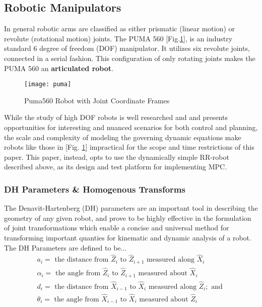 \documentclass[journal]{IEEEtran}
\begin{document}
\subsection{Robotic Manipulators}

In general robotic arms are classified as either prismatic (linear motion) or revolute (rotational motion) joints. The PUMA 560 [Fig.\ref{puma560}], is an industry standard 6 degree of freedom (DOF) manipulator. It utilizes six revolute joints, connected in a serial fashion. This configuration of only rotating joints makes the PUMA 560 an \textbf{articulated robot}.

\begin{figure}
    \centering
    \texttt{[image: puma]}
    \caption{Puma560 Robot with Joint Coordinate Frames}
    \label{puma560}
\end{figure}

While the study of high DOF robots is well researched and and presents opportunities for interesting and nuanced scenarios for both control and planning, the scale and complexity of modeling the governing dynamic equations make robots like those in [Fig. \ref{puma560}] impractical for the scope and time restrictions of this paper. \cite{armstrong_explicit_1986} This paper, instead, opts to use the dynamically simple RR-robot described above, as its design and test platform for implementing MPC.\\



\subsubsection{DH Parameters \& Homogenous Transforms}

The Denavit-Hartenberg (DH) parameters are an important tool in describing the geometry of any given robot, and prove to be highly effective in the formulation of joint transformations which enable a concise and universal method for transforming important quanties for kinematic and dynamic analysis of a robot.\\

\noindent The DH Parameters are defined to be...
    $$
    \begin{array}{l}
    a_{i}=\text { the distance from } \hat{Z}_{i} \text { to } \hat{Z}_{i+1} \text { measured along } \hat{X}_{i} \\
    \alpha_{i}=\text { the angle from } \hat{Z}_{i} \text { to } \hat{Z}_{i+1} \text { measured about } \hat{X}_{i} \\
    d_{i}=\text { the distance from } \hat{X}_{i-1} \text { to } \hat{X}_{i} \text { measured along } \hat{Z}_{i} ; \text { and } \\
    \theta_{i}=\text { the angle from } \hat{X}_{i-1} \text { to } \hat{X}_{i} \text { measured about } \hat{Z}_{i}
    \end{array}
    $$
\end{document}
